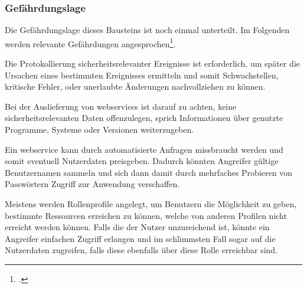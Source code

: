 \subsubsection{Gefährdungslage}\label{subsubsec:gefaehrdungslage-app.3.1}
	Die Gefährdungslage dieses Bausteins ist noch einmal unterteilt.
	Im Folgenden werden relevante Gefährdungen angesprochen\footcite[Vgl.][APP.3.2 S. 1]{holgerschildt2022}.

	Die Protokollierung sicherheitsrelevanter Ereignisse ist erforderlich,
	um später die Ursachen eines bestimmten Ereignisses ermitteln
	und somit Schwachstellen, kritische Fehler,
	oder unerlaubte Änderungen nachvollziehen zu können.

	Bei der Auslieferung von \glspl{webservice} ist darauf zu achten,
	keine sicherheitsrelevanten Daten offenzulegen,
	sprich Informationen über genutzte Programme,
	Systeme oder Versionen weiterzugeben.

	Ein \gls{webservice} kann durch automatisierte Anfragen missbraucht werden
	und somit eventuell Nutzerdaten preisgeben.
	Dadurch könnten Angreifer gültige Benutzernamen sammeln
	und sich dann damit durch mehrfaches Probieren
	von Passwörtern Zugriff zur Anwendung verschaffen.

	Meistens werden Rollenprofile angelegt,
	um Benutzern die Möglichkeit zu geben,
	bestimmte Ressourcen erreichen zu können,
	welche von anderen Profilen nicht erreicht werden können.
	Falls die  der Nutzer unzureichend ist,
	könnte ein Angreifer einfachen Zugriff erlangen
	und im schlimmsten Fall sogar auf die Nutzerdaten zugreifen,
	falls diese ebenfalls über diese Rolle erreichbar sind.